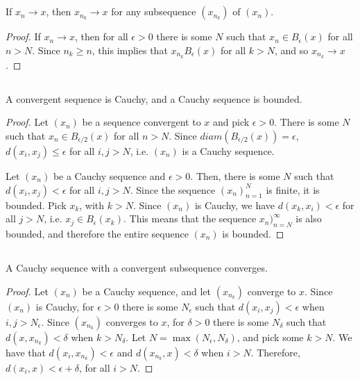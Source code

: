 \subsection{} If $x_n \rightarrow x$, then $x_{n_k} \rightarrow x$ for any subsequence $(x_{n_k})$ of $(x_n)$.

\begin{proof}
If $x_n \rightarrow x$, then for all $\epsilon>0$ there is some $N$ such that $x_n \in B_\epsilon(x)$ for all $n>N$. Since $n_k \geq n$, this implies that $x_{n_k} B_\epsilon(x)$ for all $k > N$, and so $x_{n_k} \rightarrow x$.
\end{proof}

\subsection{} A convergent sequence is Cauchy, and a Cauchy sequence is bounded.

\begin{proof}
Let $(x_n)$ be a sequence convergent to $x$ and pick $\epsilon > 0$. There is some $N$ such that $x_n \in B_{\epsilon/2}(x)$ for all $n>N$. Since $diam(B_{\epsilon/2}(x)) = \epsilon$, $d(x_i, x_j) \leq \epsilon$ for all $i,j>N$, i.e. $(x_n)$ is a Cauchy sequence.

Let $(x_n)$ be a Cauchy sequence and $\epsilon > 0$. Then, there is some $N$ such that $d(x_i, x_j) < \epsilon$ for all $i,j > N$. Since the sequence $(x_n)_{n=1}^N$ is finite, it is bounded. Pick $x_k$, with $k>N$. Since $(x_n)$ is Cauchy, we have $d(x_k, x_i) < \epsilon$ for all $j>N$, i.e. $x_j \in B_\epsilon(x_k)$. This means that the sequence $x_n)_{n=N}^\infty$ is also bounded, and therefore the entire sequence $(x_n)$ is bounded.
\end{proof}


\subsection{} A Cauchy sequence with a convergent subsequence converges.

\begin{proof}
Let $(x_n)$ be a Cauchy sequence, and let $(x_{n_k})$ converge to $x$. Since $(x_n)$ is Cauchy, for $\epsilon>0$ there is some $N_\epsilon$ such that $d(x_i, x_j) < \epsilon$ when $i,j > N_\epsilon$. Since $(x_{n_k})$ converges to $x$, for $\delta > 0$ there is some $N_\delta$ such that $d(x, x_{n_k}) < \delta$ when $k > N_\delta$. Let $N = \max(N_\epsilon, N_\delta)$, and pick some $k > N$. We have that $d(x_i, x_{n_k}) < \epsilon$ and $d(x_{n_k}, x) < \delta$ when $i > N$. Therefore, $d(x_i, x) < \epsilon + \delta$, for all $i>N$. 
\end{proof}

